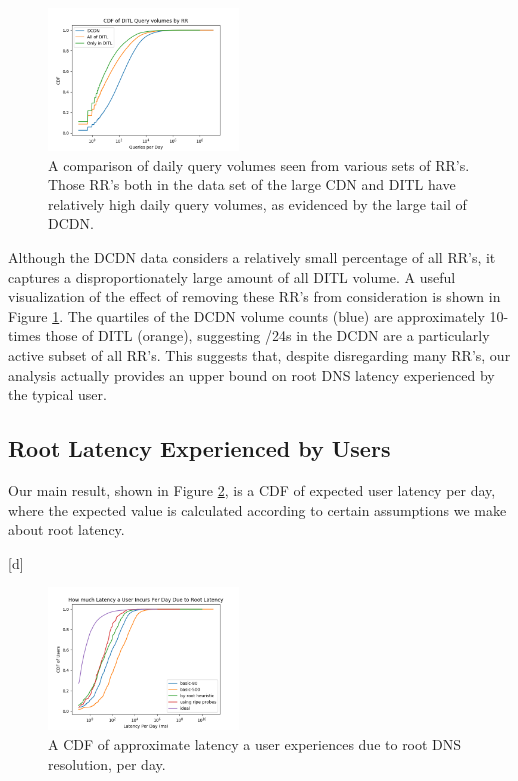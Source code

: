 \documentclass[sigconf,nonacm,10pt]{acmart}
\begin{document}
\begin{figure}
    \centering
    \includegraphics[width=0.45\textwidth]{figures/ditl_volume_comparisons.png}
    \caption{A comparison of daily query volumes seen from various sets of RR's. Those RR's both in the data set of the large CDN and DITL have relatively high daily query volumes, as evidenced by the large tail of DCDN. }
    \label{fig:ditl_volume_comparisons}
\end{figure}

Although the DCDN data considers a relatively small percentage of all
RR's, it captures a disproportionately large amount of all DITL volume.
A useful visualization of the effect of removing these RR's from
consideration is shown in Figure \ref{fig:ditl_volume_comparisons}. The
quartiles of the DCDN volume counts (blue) are approximately 10-times
those of DITL (orange), suggesting /24s in the DCDN are a particularly
active subset of all RR's. This suggests that, despite disregarding many
RR's, our analysis actually provides an upper bound on root DNS latency
experienced by the typical user.

\subsection{Root Latency Experienced by
Users}\label{root-latency-experienced-by-users-1}

Our main result, shown in Figure \ref{fig:user_root_latency_per_day}, is
a CDF of expected user latency per day, where the expected value is
calculated according to certain assumptions we make about root latency.

{[}d{]}

\begin{figure}
    \centering
    \includegraphics[width=0.45\textwidth]{figures/user_root_latency_per_day.png}
    \caption{A CDF of approximate latency a user experiences due to root DNS resolution, per day.}
    \label{fig:user_root_latency_per_day}
\end{figure}
\end{document}
